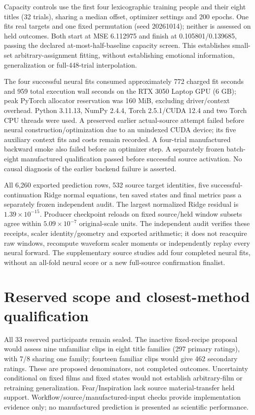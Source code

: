 \documentclass[10pt,a4paper]{article}
\begin{document}
Capacity controls use the first four lexicographic training people and their eight titles (32 trials), sharing a median offset, optimizer settings and 200 epochs. One fits real targets and one fixed permutation (seed 20261014); neither is assessed on held outcomes. Both start at MSE 6.112975 and finish at 0.105801/0.139685, passing the declared at-most-half-baseline capacity screen. This establishes small-set arbitrary-assignment fitting, without establishing emotional information, generalization or full-448-trial interpolation.

The four successful neural fits consumed approximately 772 charged fit seconds and 959 total execution wall seconds on the RTX 3050 Laptop GPU (6 GB); peak PyTorch allocator reservation was 160 MiB, excluding driver/context overhead. Python 3.11.13, NumPy 2.4.4, Torch 2.5.1/CUDA 12.4 and two Torch CPU threads were used. A preserved earlier actual-source attempt failed before neural construction/optimization due to an unindexed CUDA device; its five auxiliary context fits and costs remain recorded. A four-trial manufactured backward smoke also failed before an optimizer step. A separately frozen batch-eight manufactured qualification passed before successful source activation. No causal diagnosis of the earlier backend failure is asserted.

All 6,260 exported prediction rows, 532 source target identities, five successful-continuation Ridge normal equations, ten saved states and final metrics pass a separately frozen independent audit. The largest normalized Ridge residual is \(1.39\times10^{-15}\). Producer checkpoint reloads on fixed source/held window subsets agree within \(5.09\times10^{-7}\) original-scale units. The independent audit verifies these receipts, scaler identity/geometry and exported arithmetic; it does not reacquire raw windows, recompute waveform scaler moments or independently replay every neural forward. The supplementary source studies add four completed neural fits, without an all-fold neural score or a new full-source confirmation finalist.

\section{Reserved scope and closest-method qualification}
All 33 reserved participants remain sealed. The inactive fixed-recipe proposal would assess nine unfamiliar clips in eight title families (297 primary ratings), with 7/8 sharing one family; fourteen familiar clips would give 462 secondary ratings. These are proposed denominators, not completed outcomes. Uncertainty conditional on fixed films and fixed states would not establish arbitrary-film or retraining generalization. Fear/Inspiration lack source material-transfer held support. Workflow/source/manufactured-input checks provide implementation evidence only; no manufactured prediction is presented as scientific performance.
\end{document}
